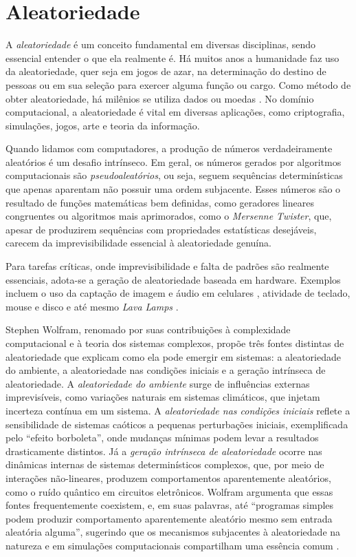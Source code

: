 \chapter{Aleatoriedade}

A \emph{aleatoriedade} é um conceito fundamental em diversas disciplinas, sendo
essencial entender o que ela realmente é. 
Há muitos anos a humanidade faz uso da aleatoriedade, quer seja em jogos de azar,
na determinação do destino de pessoas ou em sua seleção para exercer alguma
função ou cargo. Como método de obter aleatoriedade, há milênios se utiliza
dados ou moedas \parencite{metropolitan}.
No domínio computacional, a aleatoriedade é vital em diversas aplicações, como criptografia, simulações,
jogos, arte e teoria da informação. 

Quando lidamos com computadores, a produção
de números verdadeiramente aleatórios é um desafio intrínseco. Em geral, os
números gerados por algoritmos computacionais são \emph{pseudoaleatórios},
ou seja, seguem sequências determinísticas que apenas aparentam não possuir uma
ordem subjacente. Esses números são o resultado de funções matemáticas bem
definidas, como geradores lineares congruentes ou algoritmos mais aprimorados,
como o \emph{Mersenne Twister}, que, apesar de produzirem sequências com propriedades
estatísticas desejáveis, carecem da imprevisibilidade essencial à aleatoriedade
genuína.

Para tarefas críticas, onde imprevisibilidade e falta de padrões são realmente essenciais,
adota-se a geração de aleatoriedade baseada em hardware. Exemplos incluem
o uso da captação de imagem e áudio em celulares \parencite{krhovjak2007sources,chen2013}, 
atividade de teclado, mouse e disco \parencite{gutterman2006analysis} e até mesmo
\textit{Lava Lamps} \parencite{cloudflare}.

Stephen Wolfram, renomado por suas contribuições à complexidade computacional e
à teoria dos sistemas complexos, propõe três fontes distintas de aleatoriedade 
que explicam como ela pode emergir em sistemas: a aleatoriedade do ambiente, a
aleatoriedade nas condições iniciais e a geração intrínseca de aleatoriedade. A
\emph{aleatoriedade do ambiente} surge de influências externas imprevisíveis,
como variações naturais em sistemas climáticos, que injetam incerteza contínua
em um sistema. A \emph{aleatoriedade nas condições iniciais} reflete a
sensibilidade de sistemas caóticos a pequenas perturbações iniciais,
exemplificada pelo ``efeito borboleta'', onde mudanças mínimas podem levar a
resultados drasticamente distintos. Já a \emph{geração intrínseca de
aleatoriedade} ocorre nas dinâmicas internas de sistemas determinísticos
complexos, que, por meio de interações não-lineares, produzem comportamentos
aparentemente aleatórios, como o ruído quântico em circuitos eletrônicos.
Wolfram argumenta que essas fontes frequentemente coexistem, e, em suas
palavras, até ``programas simples podem produzir comportamento aparentemente
aleatório mesmo sem entrada aleatória alguma'', sugerindo que os mecanismos
subjacentes à aleatoriedade na natureza e em simulações computacionais
compartilham uma essência comum \parencite{wolfram2002}.

